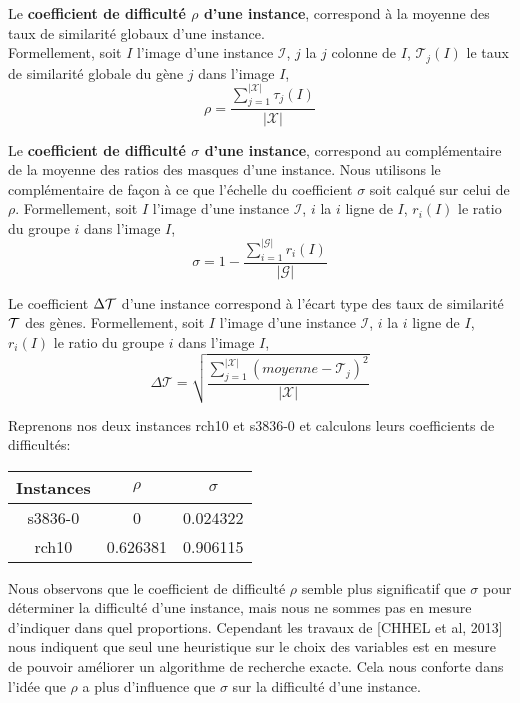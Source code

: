 \begin{definition}
Le \textbf{coefficient de difficulté $\rho$ d'une instance}, correspond à la moyenne des taux de similarité globaux d'une instance.\\
Formellement, soit $I$ l'image d'une instance $\mathcal{I}$, $j$ la $j$ colonne de $I$, $\mathcal{T}_j(I)$ le taux de similarité globale du gène $j$ dans l'image $I$,
$$ \rho=\frac{\sum_{j=1}^{|\mathcal{X}|}\tau_j(I)}{|\mathcal{X}|} $$
\end{definition}

\begin{definition}
Le \textbf{coefficient de difficulté $\sigma$ d'une instance}, correspond au complémentaire de la moyenne des ratios des masques d'une instance. Nous utilisons le complémentaire de façon à ce que l'échelle du coefficient $\sigma$ soit calqué sur celui de $\rho$.
Formellement, soit $I$ l'image d'une instance $\mathcal{I}$, $i$ la $i$ ligne de $I$, $r_i(I)$ le ratio du groupe $i$ dans l'image $I$,
$$ \sigma=1-\frac{\sum_{i=1}^{|\mathcal{G}|}r_i(I)} {|\mathcal{G}|} $$
\end{definition}

\begin{definition}
Le coefficient $\Delta\cal{T}$ d'une instance correspond à l'écart type des taux de similarité $\cal{T}$ des gènes.
Formellement, soit $I$ l'image d'une instance $\mathcal{I}$, $i$ la $i$ ligne de $I$, $r_i(I)$ le ratio du groupe $i$ dans l'image $I$,
$$\Delta\mathcal{T}=\sqrt{\frac{\sum_{j=1}^{|\mathcal{X}|} (moyenne-\mathcal{T}_j)^2}{|\mathcal{X}|}}$$
\end{definition}

Reprenons nos deux instances rch10 et s3836-0 et calculons leurs coefficients de difficultés:

\begin{center}
\begin{tabular}{|c|c|c|}
\hline 
Instances & $\rho$ & $\sigma$ \\ 
\hline 
s3836-0 & 0 & 0.024322 \\ 
\hline
rch10 & 0.626381 & 0.906115 \\ 
\hline
\end{tabular} 
\end{center}

Nous observons que le coefficient de difficulté $\rho$ semble plus significatif que $\sigma$ pour déterminer la difficulté d'une instance, mais nous ne sommes pas en mesure d'indiquer dans quel proportions. Cependant les travaux de [CHHEL et al, 2013] nous indiquent que seul une heuristique sur le choix des variables est en mesure de pouvoir améliorer un algorithme de recherche exacte. Cela nous conforte dans l'idée que $\rho$ a plus d'influence que $\sigma$ sur la difficulté d'une instance. 

